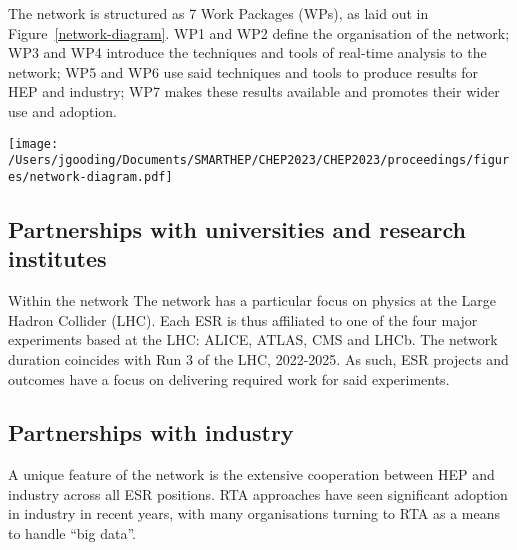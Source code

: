 The network is structured as 7 Work Packages (WPs), as laid out in Figure~\ref{network-diagram}. WP1 and WP2 define the organisation of the network; WP3 and WP4 introduce the techniques and tools of real-time analysis to the network; WP5 and WP6 use said techniques and tools to produce results for HEP and industry; WP7 makes these results available and promotes their wider use and adoption.
\begin{figure*}[h!]
    \centering
    \texttt{[image: /Users/jgooding/Documents/SMARTHEP/CHEP2023/CHEP2023/proceedings/figures/network-diagram.pdf]}
    \caption{The structure of WPs within the SMARTHEP network. WP1, ``Management'', covers the overarching management of the network by the Project Manager, Project Coordinator, and Executive Board. WP2, ``Training'', sets out training and career development for network participants, provided by partners of the network, discussed further in Section~\ref{training}. WP3, ``Machine learning \& advanced data analysis'', develops machine learning techniques for use in RTA contexts, as discussed in Section~\ref{machine-learning}. WP4, ``Hybrid architectures'', focuses upon the deployment of non-CPU architectures for acceleration of data processing, discussed in Section~\ref{hybrid-architectures}. WP5, ``Decision-making in research and industry'', uses the work of WP3 and WP4 to develop RTA-based decision-making technologies. WP6, ``Monitoring and discoveries'', also applies WP3 and WP4 to RTA approaches in data analysis. WP7, ``Dissemination and communication of results'', publication and propagation of results from work completed by particpants. }
    \label{network-diagram}       %
\end{figure*}

\subsection{Partnerships with universities and research institutes}
\label{sec-2}
Within the network 
The network has a particular focus on physics at the Large Hadron Collider (LHC). Each ESR is thus affiliated to one of the four major experiments based at the LHC: ALICE, ATLAS, CMS and LHCb. The network duration coincides with Run 3 of the LHC, 2022-2025. As such, ESR projects and outcomes have a focus on delivering required work for said experiments.

\subsection{Partnerships with industry}
\label{sec-2}
A unique feature of the network is the extensive cooperation between HEP and industry across all ESR positions. RTA approaches have seen significant adoption in industry in recent years, with many organisations turning to RTA as a means to handle ``big data''.